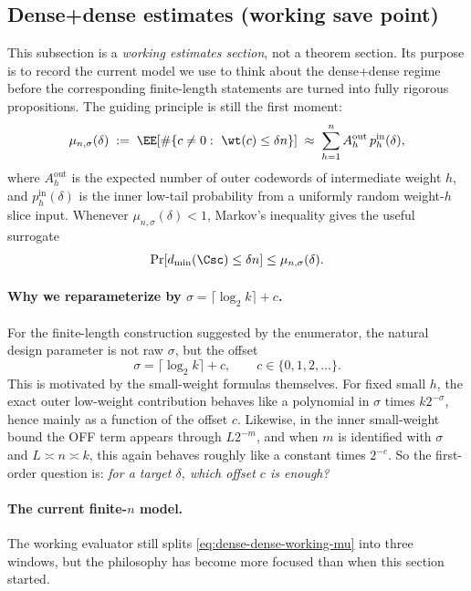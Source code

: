 \subsection{Dense+dense estimates (working save point)}
\label{sec:integration-dense-dense-estimates}

This subsection is a \emph{working estimates section}, not a theorem section.
Its purpose is to record the current model we use to think about the dense+dense regime before the corresponding
finite-length statements are turned into fully rigorous propositions.
The guiding principle is still the first moment:
\begin{equation}
\label{eq:dense-dense-working-mu}
\mu_{n,\sigma}(\delta)
\;:=\;
\EE\!\left[\#\{c\neq 0:\ \wt(c)\le \delta n\}\right]
\;\approx\;
\sum_{h=1}^{n}
A_h^{\mathrm{out}}\,
p_h^{\mathrm{in}}(\delta),
\end{equation}
where \(A_h^{\mathrm{out}}\) is the expected number of outer codewords of intermediate weight \(h\), and
\(p_h^{\mathrm{in}}(\delta)\) is the inner low-tail probability from a uniformly random weight-\(h\) slice input.
Whenever \(\mu_{n,\sigma}(\delta)<1\), Markov's inequality gives the useful surrogate
\[
\Pr[d_{\min}(\Csc)\le \delta n]\le \mu_{n,\sigma}(\delta).
\]

\paragraph{Why we reparameterize by \(\sigma=\lceil \log_2 k\rceil+c\).}
For the finite-length construction suggested by the enumerator, the natural design parameter is not raw \(\sigma\), but
the offset
\[
\sigma=\lceil \log_2 k\rceil+c,
\qquad c\in\{0,1,2,\dots\}.
\]
This is motivated by the small-weight formulas themselves.
For fixed small \(h\), the exact outer low-weight contribution behaves like a polynomial in \(\sigma\) times
\(k2^{-\sigma}\), hence mainly as a function of the offset \(c\).
Likewise, in the inner small-weight bound the OFF term appears through \(L2^{-m}\), and when \(m\) is identified with
\(\sigma\) and \(L\asymp n\asymp k\), this again behaves roughly like a constant times \(2^{-c}\).
So the first-order question is:
\emph{for a target \(\delta\), which offset \(c\) is enough?}

\paragraph{The current finite-\(n\) model.}
The working evaluator still splits \eqref{eq:dense-dense-working-mu} into three windows, but the philosophy has
become more focused than when this section started.

